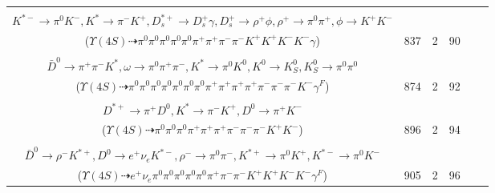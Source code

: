 \documentclass[landscape]{article}
\newcounter{rownumbers}
\newcommand\rn{\stepcounter{rownumbers}\arabic{rownumbers}}
\newcommand{\EOLP}{\\ \hline} %
\newcommand{\topoTags}[1]{#1} %
\begin{document}
\begin{longtable}{clcccc}
\rn & \makecell[l]{ $ 
\Upsilon(4S) \rightarrow B^{0} \bar{B}^{0} ,
B^{0} \rightarrow D^{-} D_{s1}^{\prime+} ,
\bar{B}^{0} \rightarrow \rho^{+} K^{*-} ,
D^{-} \rightarrow \pi^{0} \pi^{-} K^{*} ,
D_{s1}^{\prime+} \rightarrow \pi^{0} D_{s}^{*+} ,
\rho^{+} \rightarrow \pi^{0} \pi^{+} ,
$ \\ $
K^{*-} \rightarrow \pi^{0} K^{-} ,
K^{*} \rightarrow \pi^{-} K^{+} ,
D_{s}^{*+} \rightarrow D_{s}^{+} \gamma ,
D_{s}^{+} \rightarrow \rho^{+} \phi ,
\rho^{+} \rightarrow \pi^{0} \pi^{+} ,
\phi \rightarrow K^{+} K^{-} 
$ \\ ($
\Upsilon(4S) \dashrightarrow \pi^{0} \pi^{0} \pi^{0} \pi^{0} \pi^{0} \pi^{+} \pi^{+} \pi^{-} \pi^{-} K^{+} K^{+} K^{-} K^{-} \gamma 
$) } & \topoTags{837 & }2 & 90 \EOLP

\rn & \makecell[l]{ $ 
\Upsilon(4S) \rightarrow B^{0} \bar{B}^{0} ,
B^{0} \rightarrow D_{2}^{*-} D_{s}^{+} ,
\bar{B}^{0} \rightarrow \pi^{0} \rho^{+} K^{-} \gamma^{F} ,
D_{2}^{*-} \rightarrow \pi^{-} \bar{D}^{0} ,
D_{s}^{+} \rightarrow \pi^{0} \pi^{+} \omega ,
\rho^{+} \rightarrow \pi^{0} \pi^{+} ,
$ \\ $
\bar{D}^{0} \rightarrow \pi^{+} \pi^{-} K^{*} ,
\omega \rightarrow \pi^{0} \pi^{+} \pi^{-} ,
K^{*} \rightarrow \pi^{0} K^{0} ,
K^{0} \rightarrow K_{S}^{0} ,
K_{S}^{0} \rightarrow \pi^{0} \pi^{0} 
$ \\ ($
\Upsilon(4S) \dashrightarrow \pi^{0} \pi^{0} \pi^{0} \pi^{0} \pi^{0} \pi^{0} \pi^{0} \pi^{+} \pi^{+} \pi^{+} \pi^{+} \pi^{-} \pi^{-} \pi^{-} K^{-} \gamma^{F} 
$) } & \topoTags{874 & }2 & 92 \EOLP

\rn & \makecell[l]{ $ 
\Upsilon(4S) \rightarrow B^{0} \bar{B}^{0} ,
B^{0} \rightarrow \rho^{+} D^{-} ,
\bar{B}^{0} \rightarrow \rho^{-} D^{*+} ,
\rho^{+} \rightarrow \pi^{0} \pi^{+} ,
D^{-} \rightarrow \pi^{0} \pi^{-} K^{*} ,
\rho^{-} \rightarrow \pi^{0} \pi^{-} ,
$ \\ $
D^{*+} \rightarrow \pi^{+} D^{0} ,
K^{*} \rightarrow \pi^{-} K^{+} ,
D^{0} \rightarrow \pi^{+} K^{-} 
$ \\ ($
\Upsilon(4S) \dashrightarrow \pi^{0} \pi^{0} \pi^{0} \pi^{+} \pi^{+} \pi^{+} \pi^{-} \pi^{-} \pi^{-} K^{+} K^{-} 
$) } & \topoTags{896 & }2 & 94 \EOLP

\rn & \makecell[l]{ $ 
\Upsilon(4S) \rightarrow B^{0} \bar{B}^{0} ,
B^{0} \rightarrow \pi^{0} K^{*} ,
\bar{B}^{0} \rightarrow K^{*-} D^{*+} \bar{D}^{0} ,
K^{*} \rightarrow \pi^{-} K^{+} ,
K^{*-} \rightarrow \pi^{0} K^{-} \gamma^{F} ,
D^{*+} \rightarrow \pi^{+} D^{0} ,
$ \\ $
\bar{D}^{0} \rightarrow \rho^{-} K^{*+} ,
D^{0} \rightarrow e^{+} \nu_{e} K^{*-} ,
\rho^{-} \rightarrow \pi^{0} \pi^{-} ,
K^{*+} \rightarrow \pi^{0} K^{+} ,
K^{*-} \rightarrow \pi^{0} K^{-} 
$ \\ ($
\Upsilon(4S) \dashrightarrow e^{+} \nu_{e} \pi^{0} \pi^{0} \pi^{0} \pi^{0} \pi^{0} \pi^{+} \pi^{-} \pi^{-} K^{+} K^{+} K^{-} K^{-} \gamma^{F} 
$) } & \topoTags{905 & }2 & 96 \EOLP


\end{longtable}
\end{document}
